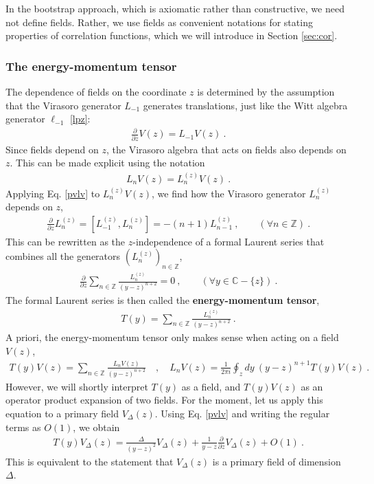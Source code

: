 \documentclass[12pt, a4paper]{article}
\theoremstyle{break}
\begin{document}
In the bootstrap approach, which is axiomatic rather than constructive, we need not define fields. Rather, we use fields as convenient notations for stating properties of correlation functions, which we will introduce in Section \ref{sec:cor}. 

\subsubsection{The energy-momentum tensor}

The dependence of fields on the coordinate $z$ is determined by the assumption that the Virasoro generator $L_{-1}$ generates translations, just like the Witt algebra generator $\ell_{-1}$ \eqref{lpz}:
\begin{align}
  \boxed{\frac{\partial}{\partial z} V(z) = L_{-1} V(z)}  \ .
  \label{pvlv}
 \end{align}
 Since fields depend on $z$, the Virasoro algebra that acts on fields also depends on $z$. This can be made explicit using the notation
\begin{align}
   L_n V(z) = L_n^{(z)} V(z) \ . 
\end{align}
Applying Eq. \eqref{pvlv} to $L_n^{(z)} V(z)$, we find how the Virasoro generator $L_n^{(z)}$ depends on $z$,
 \begin{align}
 \frac{\partial}{\partial z} L_n^{(z)} = [L_{-1}^{(z)},L_n^{(z)}]= -(n+1)L_{n-1}^{(z)}\ ,\qquad (\forall n\in\mathbb{Z})\ .
\end{align}
This can be rewritten as the $z$-independence of a formal Laurent series that combines all the generators $(L_n^{(z)})_{n\in\mathbb{Z}}$, 
\begin{align}
 \frac{\partial}{\partial z} \sum_{n\in\mathbb{Z}} \frac{L_n^{(z)}}{(y-z)^{n+2}} = 0\ ,\qquad (\forall y\in\mathbb{C}-\{z\})\ .
\end{align}
The formal Laurent series is then called the \textbf{energy-momentum tensor}, 
\begin{align}
  \boxed{T(y) = \sum_{n\in\mathbb{Z}} \frac{L_n^{(z)}}{(y-z)^{n+2}}} \ .
  \label{tl}
 \end{align}
 A priori, the energy-momentum tensor only makes sense when acting on a field $V(z)$,
 \begin{align}
 T(y)V(z) = \sum_{n\in\mathbb{Z}} \frac{L_n V(z)}{(y-z)^{n+2}}\quad , \quad L_n V(z) = \frac{1}{2\pi i} \oint_{z}dy\ (y-z)^{n+1} T(y)V(z)\ .
 \label{lvtv}
\end{align}
However, we will shortly interpret $T(y)$ as a field, and $T(y)V(z)$ as an operator product expansion of two fields. For the moment, let us apply this equation to a primary field $V_\Delta(z)$. Using Eq. \eqref{pvlv} and writing the regular terms as $O(1)$, we obtain
\begin{align}
 \boxed{T(y)V_\Delta(z) = \frac{\Delta}{(y-z)^2} V_\Delta(z) + \frac{1}{y-z} \frac{\partial}{\partial z} V_\Delta(z) + O(1)}\ .
 \label{tvd}
\end{align}
This is equivalent to the statement that $V_\Delta(z)$ is a primary field of dimension $\Delta$.
\end{document}
